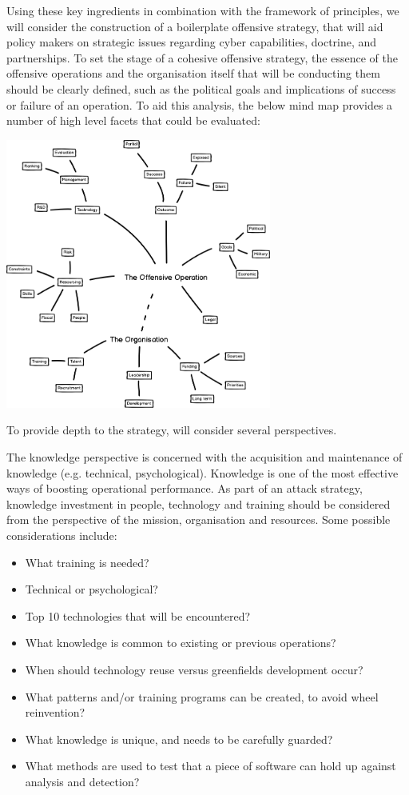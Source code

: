\documentclass[11pt]{report}
\begin{document}
Using these key ingredients in combination with the framework of principles, we will consider the construction of a boilerplate offensive strategy, that will aid policy makers on strategic issues regarding cyber capabilities, doctrine, and partnerships. To set the stage of a cohesive offensive strategy, the essence of the offensive operations and the organisation itself that will be conducting them should be clearly defined, such as the political goals and implications of success or failure of an operation. To aid this analysis, the below mind map provides a number of high level facets that could be evaluated:


\includegraphics[width=330px]{mindmap.png}

\begingroup %
\endgroup

To provide depth to the strategy, will consider several perspectives.

The knowledge perspective is concerned with the acquisition and maintenance of knowledge (e.g. technical, psychological). Knowledge is one of the most effective ways of boosting operational performance. As part of an attack strategy, knowledge investment in people, technology and training should be considered from the perspective of the mission, organisation and resources. Some possible considerations include:

\begin{itemize}
	\item What training is needed?
	\item Technical or psychological?
	\item Top 10 technologies that will be encountered?
	\item What knowledge is common to existing or previous operations?
	\item When should technology reuse versus greenfields development occur?
	\item What patterns and/or training programs can be created, to avoid wheel reinvention?
	\item What knowledge is unique, and needs to be carefully guarded?
	\item What methods are used to test that a piece of software can hold up against analysis and detection?
\end{itemize}
\end{document}
